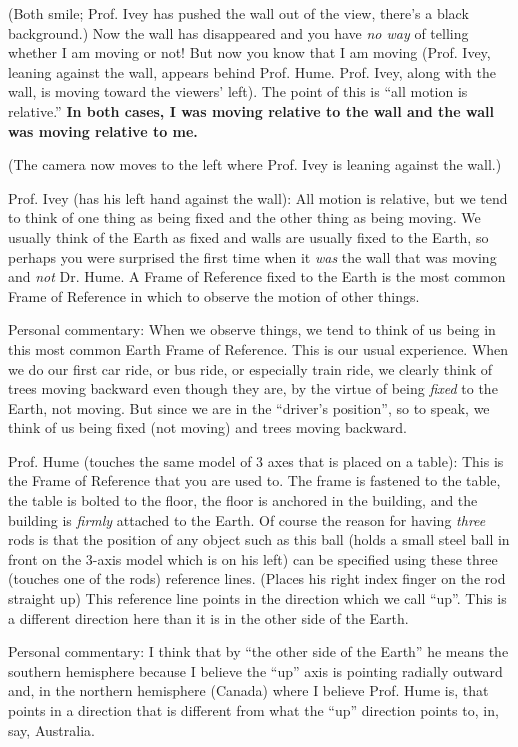\documentclass[a6paper]{article}
\newcommand{\perscom}[1]{
    {\footnotesize Personal commentary:  #1}
}
\begin{document}
(Both smile; Prof. Ivey has pushed the wall out of the view, there's a black background.) Now the wall has disappeared and you have \emph{no way} of telling whether I am moving or not! But now you know that I am moving (Prof. Ivey, leaning against the wall, appears behind Prof. Hume. Prof. Ivey, along with the wall, is moving toward the viewers' left). The point of this is ``all motion is relative.'' \textbf{In both cases, I was moving relative to the wall and the wall was moving relative to me.}

(The camera now moves to the left where Prof. Ivey is leaning against the wall.)

Prof. Ivey (has his left hand against the wall): All motion is relative, but we tend to think of one thing as being fixed and the other thing as being moving. We usually think of the Earth as fixed and walls are usually fixed to the Earth, so perhaps you were surprised the first time when it \emph{was} the wall that was moving and \emph{not} Dr. Hume. A Frame of Reference fixed to the Earth is the most common Frame of Reference in which to observe the motion of other things.

\perscom{ When we observe things, we tend to think of us being in this most common Earth Frame of Reference. This is our usual experience. When we do our first car ride, or bus ride, or especially train ride, we clearly think of trees moving backward even though they are, by the virtue of being \emph{fixed} to the Earth, not moving. But since we are in the ``driver's position'', so to speak, we think of us being fixed (not moving) and trees moving backward.}

Prof. Hume (touches the same model of 3 axes that is placed on a table): This is the Frame of Reference that you are used to. The frame is fastened to the table, the table is bolted to the floor, the floor is anchored in the building, and the building is \emph{firmly} attached to the Earth. Of course the reason for having \emph{three} rods is that the position of any object such as this ball (holds a small steel ball in front on the 3-axis model which is on his left) can be specified using these three (touches one of the rods) reference lines. (Places his right index finger on the rod straight up) This reference line points in the direction which we call ``up''. This is a different direction here than it is in the other side of the Earth.

\perscom{ I think that by ``the other side of the Earth'' he means the southern hemisphere because I believe the ``up'' axis is pointing radially outward and, in the northern hemisphere (Canada) where I believe Prof. Hume is, that points in a direction that is different from what the ``up'' direction points to, in, say, Australia.}
\end{document}
